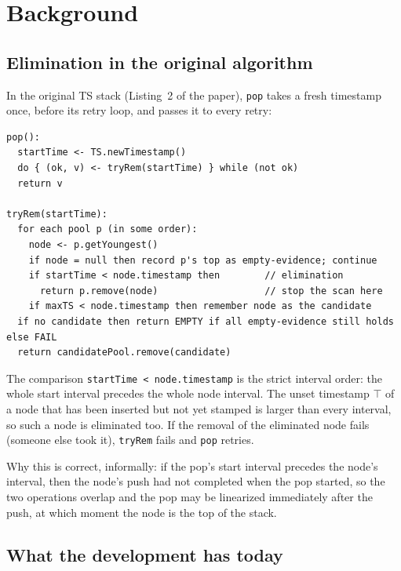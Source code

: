 \documentclass[11pt]{article}
\theoremstyle{definition}
\theoremstyle{remark}
\newcommand{\code}[1]{\texttt{#1}}
\newcommand{\TSTop}{\top}
\begin{document}
\section{Background}

\subsection{Elimination in the original algorithm}

In the original TS stack (Listing~2 of the paper), \code{pop} takes a
fresh timestamp once, before its retry loop, and passes it to every
retry:

\begin{lstlisting}
pop():
  startTime <- TS.newTimestamp()
  do { (ok, v) <- tryRem(startTime) } while (not ok)
  return v

tryRem(startTime):
  for each pool p (in some order):
    node <- p.getYoungest()
    if node = null then record p's top as empty-evidence; continue
    if startTime < node.timestamp then        // elimination
      return p.remove(node)                   // stop the scan here
    if maxTS < node.timestamp then remember node as the candidate
  if no candidate then return EMPTY if all empty-evidence still holds else FAIL
  return candidatePool.remove(candidate)
\end{lstlisting}

The comparison \code{startTime < node.timestamp} is the strict interval
order: the whole start interval precedes the whole node interval. The
unset timestamp $\TSTop$ of a node that has been inserted but not yet
stamped is larger than every interval, so such a node is eliminated too.
If the removal of the eliminated node fails (someone else took it),
\code{tryRem} fails and \code{pop} retries.

Why this is correct, informally: if the pop's start interval precedes the
node's interval, then the node's push had not completed when the pop
started, so the two operations overlap and the pop may be linearized
immediately after the push, at which moment the node is the top of the
stack.

\subsection{What the development has today}
\end{document}
